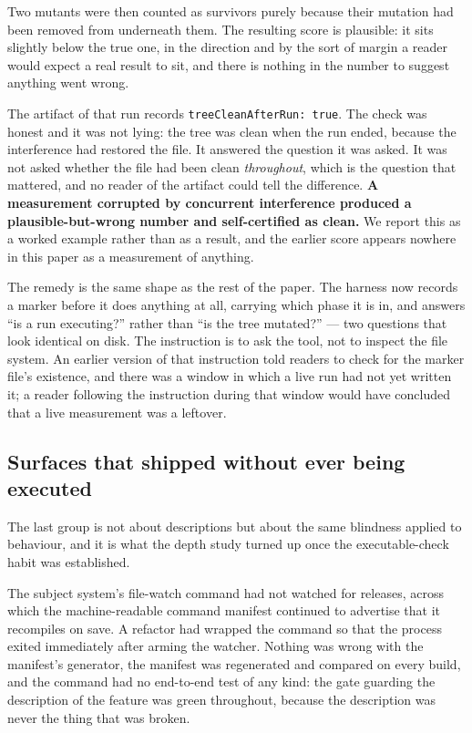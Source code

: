 \documentclass[10pt,journal,compsoc]{IEEEtran}
\begin{document}
Two mutants were then counted as survivors purely because their mutation had been removed from
underneath them. The resulting score is plausible: it sits slightly below the true one, in the
direction and by the sort of margin a reader would expect a real result to sit, and there is
nothing in the number to suggest anything went wrong.

The artifact of that run records \texttt{treeCleanAfterRun: true}. The check was honest and it
was not lying: the tree was clean when the run ended, because the interference had restored the
file. It answered the question it was asked. It was not asked whether the file had been clean
\emph{throughout}, which is the question that mattered, and no reader of the artifact could tell
the difference. \textbf{A measurement corrupted by concurrent interference produced a
plausible-but-wrong number and self-certified as clean.} We report this as a worked example
rather than as a result, and the earlier score appears nowhere in this paper as a measurement of
anything.

The remedy is the same shape as the rest of the paper. The harness now records a marker before
it does anything at all, carrying which phase it is in, and answers ``is a run executing?''
rather than ``is the tree mutated?'' --- two questions that look identical on disk. The
instruction is to ask the tool, not to inspect the file system. An earlier version of that
instruction told readers to check for the marker file's existence, and there was a window in
which a live run had not yet written it; a reader following the instruction during that window
would have concluded that a live measurement was a leftover.

\subsection{Surfaces that shipped without ever being executed}

The last group is not about descriptions but about the same blindness applied to behaviour, and
it is what the depth study turned up once the executable-check habit was established.

The subject system's file-watch command had not watched for \factWatchBrokenReleases{} releases,
across which the machine-readable command manifest continued to advertise that it recompiles on
save. A refactor had wrapped the command so that the process exited immediately after arming the
watcher. Nothing was wrong with the manifest's generator, the manifest was regenerated and
compared on every build, and the command had no end-to-end test of any kind: the gate guarding
the description of the feature was green throughout, because the description was never the thing
that was broken.
\end{document}
